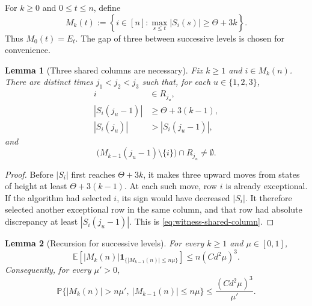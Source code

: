 \documentclass[reqno,english]{amsart}
\newcommand*{\PP}{\mathbb P}
\newcommand*{\EE}{\mathbb E}
\newcommand*{\ind}{\mathbf 1}
\newtheorem{lemma}[lemma]{Lemma}
\theoremstyle{definition}
\begin{document}
For $k\ge0$ and $0\le t\le n$, define
\begin{equation}\label{eq:M-def}
    M_k(t):=\left\{i\in[n]:
       \max_{s\le t}|S_i(s)|\ge\Theta+3k\right\}.
\end{equation}
Thus $M_0(t)=E_t$.  The gap of three between successive levels is chosen 
for convenience.

\begin{lemma}[Three shared columns are necessary]\label{lem:witness}
Fix $k\ge1$ and $i\in M_k(n)$.  There are distinct times
$j_1<j_2<j_3$ such that, for each $u\in\{1,2,3\}$,
\begin{align*}
    i&\in R_{j_u},\\
    |S_i(j_u-1)|&\ge\Theta+3(k-1),\\
    |S_i(j_u)|&>|S_i(j_u-1)|,
\end{align*}
and
\begin{equation}\label{eq:witness-shared-column}
    \big(M_{k-1}(j_u-1)\setminus\{i\}\big)\cap R_{j_u}\ne\emptyset.
\end{equation}
\end{lemma}

\begin{proof}
Before $|S_i|$ first reaches $\Theta+3k$, it makes three upward moves from
states of height at least $\Theta+3(k-1)$.  At each such move, row $i$ is
already exceptional.  If the algorithm had selected $i$, its sign would have
decreased $|S_i|$.  It therefore selected another exceptional row in the
same column, and that row had absolute discrepancy at least
$|S_i(j_u-1)|$.  This is \eqref{eq:witness-shared-column}.
\end{proof}

\begin{lemma}[Recursion for successive levels]\label{lem:level-recursion}
For every $k\ge1$ and $\mu\in[0,1]$,
\begin{equation}\label{eq:level-expectation}
 \EE\left[
  |M_k(n)|\ind_{\{|M_{k-1}(n)|\le n\mu\}}
 \right]
 \le n(Cd^2\mu)^3.
\end{equation}
Consequently, for every $\mu'>0$,
\begin{equation}\label{eq:level-Markov}
 \PP\{|M_k(n)|>n\mu',\ |M_{k-1}(n)|\le n\mu\}
 \le\frac{(Cd^2\mu)^3}{\mu'}.
\end{equation}
\end{lemma}
\end{document}

